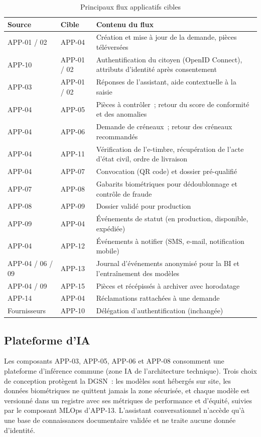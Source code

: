\begin{table}[h]
\caption{Principaux flux applicatifs cibles}
\label{tab:flux}
\centering
\small
\begin{tabularx}{\columnwidth}{llX}
\toprule
\textbf{Source} & \textbf{Cible} & \textbf{Contenu du flux} \\
\midrule
APP-01 / 02 & APP-04 & Création et mise à jour de la demande, pièces téléversées \\
APP-10 & APP-01 / 02 & Authentification du citoyen (OpenID Connect), attributs d'identité après consentement \\
APP-03 & APP-01 / 02 & Réponses de l'assistant, aide contextuelle à la saisie \\
APP-04 & APP-05 & Pièces à contrôler~; retour du score de conformité et des anomalies \\
APP-04 & APP-06 & Demande de créneaux~; retour des créneaux recommandés \\
APP-04 & APP-11 & Vérification de l'e-timbre, récupération de l'acte d'état civil, ordre de livraison \\
APP-04 & APP-07 & Convocation (QR code) et dossier pré-qualifié \\
APP-07 & APP-08 & Gabarits biométriques pour dédoublonnage et contrôle de fraude \\
APP-08 & APP-09 & Dossier validé pour production \\
APP-09 & APP-04 & Événements de statut (en production, disponible, expédiée) \\
APP-04 & APP-12 & Événements à notifier (SMS, e-mail, notification mobile) \\
APP-04 / 06 / 09 & APP-13 & Journal d'événements anonymisé pour la BI et l'entraînement des modèles \\
APP-04 / 09 & APP-15 & Pièces et récépissés à archiver avec horodatage \\
APP-14 & APP-04 & Réclamations rattachées à une demande \\
Fournisseurs & APP-10 & Délégation d'authentification (inchangée) \\
\bottomrule
\end{tabularx}
\end{table}

\subsection{Plateforme d'IA}
Les composants APP-03, APP-05, APP-06 et APP-08 consomment une plateforme d'inférence commune (zone IA de l'architecture technique). Trois choix de conception protègent la DGSN~: les modèles sont hébergés sur site, les données biométriques ne quittent jamais la zone sécurisée, et chaque modèle est versionné dans un registre avec ses métriques de performance et d'équité, suivies par le composant MLOps d'APP-13. L'assistant conversationnel n'accède qu'à une base de connaissances documentaire validée et ne traite aucune donnée d'identité.

